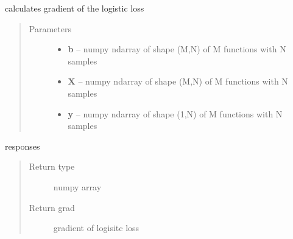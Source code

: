 \documentclass[letterpaper,10pt,english]{sphinxmanual}
\begin{document}
\begin{fulllineitems}
\label{regression:regression.logit_gradient}
calculates gradient of the logistic loss
\begin{quote}\begin{description}
\item[{Parameters}] \leavevmode\begin{itemize}
\item {} 
\textbf{b} -- numpy ndarray of shape (M,N) of M functions with N samples

\item {} 
\textbf{X} -- numpy ndarray of shape (M,N) of M functions with N samples

\item {} 
\textbf{y} -- numpy ndarray of shape (1,N) of M functions with N samples

\end{itemize}

\end{description}\end{quote}

responses
\begin{quote}\begin{description}
\item[{Return type}] \leavevmode
numpy array

\item[{Return grad}] \leavevmode
gradient of logisitc loss

\end{description}\end{quote}

\end{fulllineitems}

\end{document}
